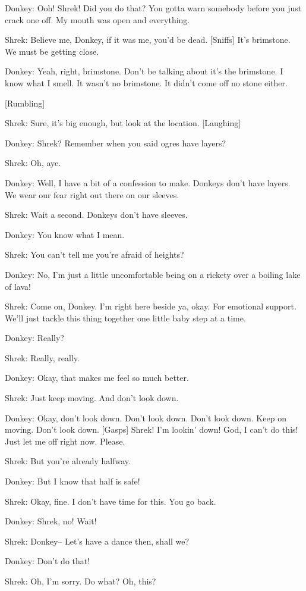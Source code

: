 \documentclass{article}
\begin{document}
Donkey:
Ooh! Shrek! Did you do that? You gotta warn somebody before you just crack one off. My mouth was open and everything.

Shrek:
Believe me, Donkey, if it was me, you'd be dead. [Sniffs] It's brimstone. We must be getting close.

Donkey:
Yeah, right, brimstone. Don't be talking about it's the brimstone. I know what I smell. It wasn't no brimstone. It didn't come off no stone either.

[Rumbling]

Shrek:
Sure, it's big enough, but look at the location. [Laughing]

Donkey:
Shrek? Remember when you said ogres have layers?

Shrek:
Oh, aye.

Donkey:
Well, I have a bit of a confession to make. Donkeys don't have layers. We wear our fear right out there on our sleeves.

Shrek:
Wait a second. Donkeys don't have sleeves.

Donkey:
You know what I mean.

Shrek:
You can't tell me you're afraid of heights?

Donkey:
No, I'm just a little uncomfortable being on a rickety over a boiling lake of lava!

Shrek:
Come on, Donkey. I'm right here beside ya, okay. For emotional support. We'll just tackle this thing together one little baby step at a time.

Donkey:
Really?

Shrek:
Really, really.

Donkey:
Okay, that makes me feel so much better.

Shrek:
Just keep moving. And don't look down.

Donkey:
Okay, don't look down. Don't look down. Don't look down. Keep on moving. Don't look down. [Gasps] Shrek! I'm lookin' down! God, I can't do this! Just let me off right now. Please.

Shrek:
But you're already halfway.

Donkey:
But I know that half is safe!

Shrek:
Okay, fine. I don't have time for this. You go back.

Donkey:
Shrek, no! Wait!

Shrek:
Donkey-- Let's have a dance then, shall we?

Donkey:
Don't do that!

Shrek:
Oh, I'm sorry. Do what? Oh, this?
\end{document}
